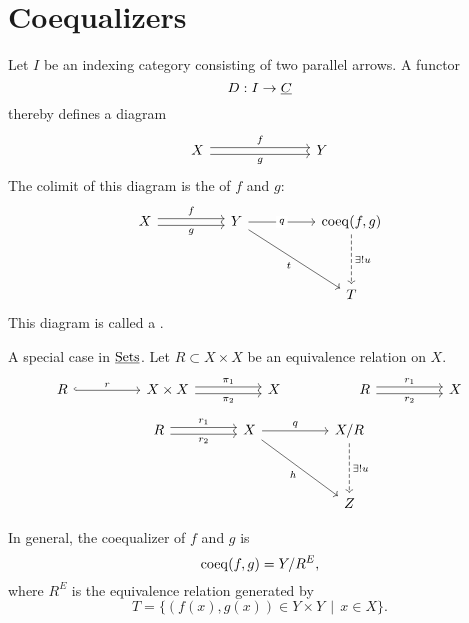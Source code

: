 
\section{Coequalizers}

Let \( I \) be an indexing category consisting of two parallel arrows. A functor
\[
	D: I \to \underline{C}
\]
thereby defines a diagram
\[
	\begin{tikzcd}
		X &&& Y
		\arrow["f", shift left, from=1-1, to=1-4]
		\arrow["g"', shift right, from=1-1, to=1-4]
	\end{tikzcd}
\]
The colimit of this diagram is the  of \( f \) and \( g \):
\[
	\begin{tikzcd}
		X && Y && {\coeq(f,g)} \\
		\\
		&&&& T
		\arrow["f", shift left, from=1-1, to=1-3]
		\arrow["g"', shift right, from=1-1, to=1-3]
		\arrow["q"{description}, from=1-3, to=1-5]
		\arrow["t"', from=1-3, to=3-5]
		\arrow["{\exists! u}", dashed, from=1-5, to=3-5]
	\end{tikzcd}
\]
This diagram is called a .

\begin{examples*}
	\item A special case in \( \underline{\mathrm{Sets}} \). Let \( R \subset X \times X \) be an equivalence relation on \( X \).
		\[
			\begin{tikzcd}
				R && {X \times X} && X && R && X
				\arrow["r", hook, from=1-1, to=1-3]
				\arrow["{\pi_1}", shift left, from=1-3, to=1-5]
				\arrow["{\pi_2}"', shift right, from=1-3, to=1-5]
				\arrow["{r_1}", shift left, from=1-7, to=1-9]
				\arrow["{r_2}"', shift right, from=1-7, to=1-9]
			\end{tikzcd}
		\]
		\[
			\begin{tikzcd}
				R && X && {X/R} \\
				\\
				&&&& Z
				\arrow["{r_1}", shift left, from=1-1, to=1-3]
				\arrow["{r_2}"', shift right, from=1-1, to=1-3]
				\arrow["q", from=1-3, to=1-5]
				\arrow["h"', from=1-3, to=3-5]
				\arrow["{\exists! u}", dashed, from=1-5, to=3-5]
			\end{tikzcd}
		\]
	\item In general, the coequalizer of \( f \) and \( g \) is
		\[
			\operatorname{coeq}(f, g) = Y/R^E,
		\]
		where \( R^E \) is the equivalence relation generated by
		\[
			T = \{(f(x), g(x)) \in Y \times Y \,\mid\, x \in X\}.
		\]
\end{examples*}

